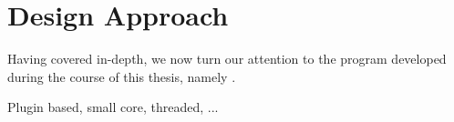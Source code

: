 
\chapter{Design Approach} \label{chapter:designapproach}

Having covered \simavr in-depth, we now turn our attention to the program developed
during the course of this thesis, namely \qsimavr.

Plugin based, small core, threaded, ...